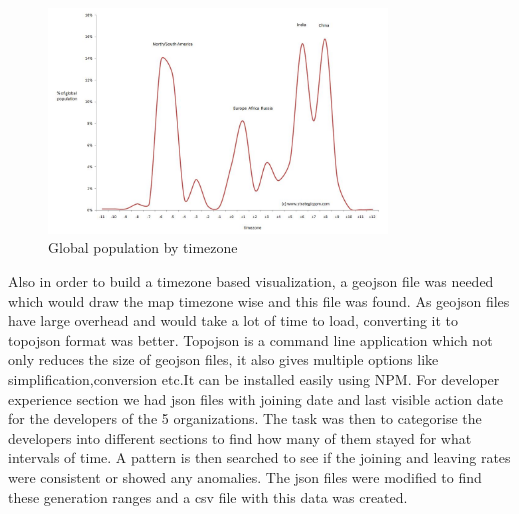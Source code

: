\documentclass[seploa]{beavtex}
\begin{document}
\begin{figure}[!ht]
\centering
\includegraphics[width=90mm]{pop1.jpg}
\caption{Global population by timezone}
\end{figure}

Also in order to build a timezone based visualization, a geojson file was needed which would draw the map timezone wise and this file was found. As geojson files have large overhead and would take a lot of time to load, converting it to topojson format was better. Topojson is a command line application which not only reduces the size of geojson files, it also gives multiple options like simplification,conversion etc.It can be installed easily using NPM. For developer experience section we had json files with joining date and last visible action date for the developers of the 5 organizations. The task was then to categorise the developers into different sections to find how many of them stayed for what intervals of time. A pattern is then searched to see if the joining and leaving rates were consistent or showed any anomalies. The json files were modified to find these generation ranges and a csv file with this data was created.
\end{document}
